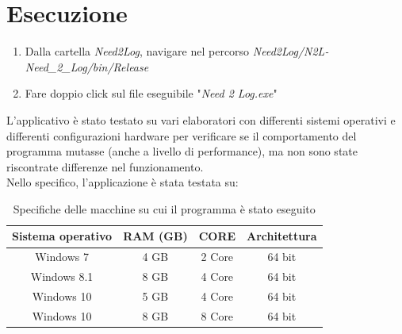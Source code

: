 \documentclass[a4paper,10pt]{report}
\begin{document}
  \section{Esecuzione}
    \begin{enumerate}
    	\item Dalla cartella {\itshape Need2Log}, navigare nel percorso {\itshape Need2Log/N2L-Need\_2\_Log/bin/Release}
			\item Fare doppio click sul file eseguibile "{\itshape Need 2 Log.exe}"
    	\end{enumerate}
		L'applicativo è stato testato su vari elaboratori con differenti sistemi
			operativi e differenti configurazioni hardware per verificare se il
			comportamento del programma mutasse (anche a livello di performance),
			ma non sono state riscontrate differenze nel funzionamento.\\
			Nello specifico, l'applicazione è stata testata su:
		\begin{table}[h]
			\centering
			\begin{tabular}{|c|c|c|c|}
				\hline
				\textbf{Sistema operativo} & \textbf{RAM (GB)} & \textbf{CORE} & \textbf{Architettura}\\ \hline
				Windows 7 & 4 GB & 2 Core & 64 bit\\ \hline
				Windows 8.1 & 8 GB & 4 Core & 64 bit\\ \hline
				Windows 10 & 5 GB & 4 Core & 64 bit\\ \hline
				Windows 10 & 8 GB & 8 Core & 64 bit\\
				\hline
				\end{tabular}
			\caption{Specifiche delle macchine su cui il programma è stato eseguito}
			\label{tab:tabellaTest}
			\end{table}
\end{document}
